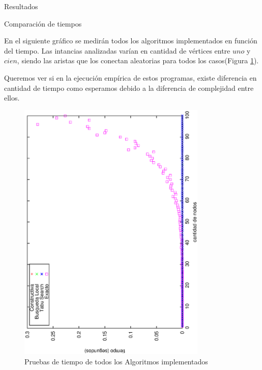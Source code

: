 \documentclass[12pt,titlepage]{article}
\begin{document}
	\newpage

	

	\newpage

	
	
	\newpage
	
	
	
	\newpage
	
	\begin{section}{Resultados}

		\begin{subsection}{Comparación de tiempos}

		En el siguiente gráfico se medirán todos los algoritmos implementados en función del tiempo. Las intancias analizadas varían en cantidad de vértices entre $uno$ y $cien$, siendo las aristas que los conectan aleatorias para todos los casos(Figura \ref{fig:Tiempo de los Algoritmos}).
		
		Queremos ver si en la ejecución empírica de estos programas, existe diferencia en cantidad de tiempo como esperamos debido a la diferencia de complejidad entre ellos.
		
		\begin{figure}[H]
			\centering
					\includegraphics[width=9cm,angle=-90]{conclusiones/heuris_vs_exacto.eps}
			\caption{Pruebas de tiempo de todos los Algoritmos implementados}
			\label{fig:Tiempo de los Algoritmos}
		\end{figure}
		

\end{subsection}
\end{section}
\end{document}

